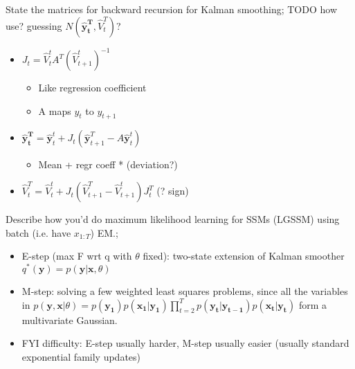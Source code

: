 \documentclass{article}
\begin{document}
State the matrices for backward recursion for Kalman smoothing; TODO how use? guessing $N(\mathbf{\hat{y}^T_t},\hat{V}^T_t)$?  \begin{itemize} \item $J_t=\hat{V}^t_tA^T(\hat{V}^t_{t+1})^{-1}$ \begin{itemize} \item Like regression coefficient \item A maps $y_t$ to $y_{t+1}$ \end{itemize} \item $\mathbf{\hat{y}^T_t}=\hat{\mathbf{y}}^t_t+J_t(\hat{\mathbf{y}}^T_{t+1}-A\hat{\mathbf{y}}^t_t)$ \begin{itemize} \item Mean + regr coeff * (deviation?) \end{itemize} \item $\hat{V}^T_t=\hat{V}^t_t+J_t(\hat{V}^T_{t+1}-\hat{V}^t_{t+1})J_t^T$ (? sign) \end{itemize}

Describe how you'd do maximum likelihood learning for SSMs (LGSSM) using batch (i.e. have $x_{1:T}$) EM.; \begin{itemize} \item E-step (max F wrt q with $\theta$ fixed): two-state extension of Kalman smoother $q^*(\mathbf{y})=p(\mathbf{y|x}, \theta)$ \item M-step: solving a few weighted least squares problems, since all the variables in $p(\mathbf{y, x}|\theta)=p(\mathbf{y_1})p(\mathbf{x_1|y_1})\prod_{t=2}^Tp(\mathbf{y_t|y_{t-1}})p(\mathbf{x_t|y_t})$ form a multivariate Gaussian. \item FYI difficulty: E-step usually harder, M-step usually easier (usually standard exponential family updates) \end{itemize}
\end{document}

